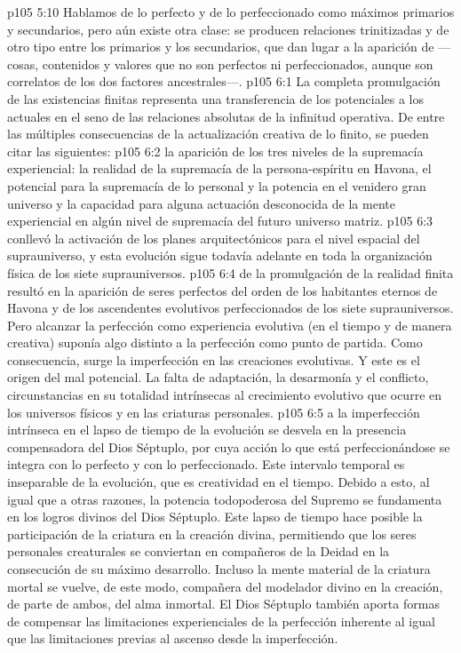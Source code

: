 \vs p105 5:10 Hablamos de lo perfecto y de lo perfeccionado como máximos primarios y secundarios, pero aún existe otra clase: se producen relaciones trinitizadas y de otro tipo entre los primarios y los secundarios, que dan lugar a la aparición de  ---cosas, contenidos y valores que no son perfectos ni perfeccionados, aunque son correlatos de los dos factores ancestrales---.
\vs p105 6:1 La completa promulgación de las existencias finitas representa una transferencia de los potenciales a los actuales en el seno de las relaciones absolutas de la infinitud operativa. De entre las múltiples consecuencias de la actualización creativa de lo finito, se pueden citar las siguientes:
\vs p105 6:2  la aparición de los tres niveles de la supremacía experiencial: la realidad de la supremacía de la persona\hyp{}espíritu en Havona, el potencial para la supremacía de lo personal y la potencia en el venidero gran universo y la capacidad para alguna actuación desconocida de la mente experiencial en algún nivel de supremacía del futuro universo matriz.
\vs p105 6:3  conllevó la activación de los planes arquitectónicos para el nivel espacial del suprauniverso, y esta evolución sigue todavía adelante en toda la organización física de los siete suprauniversos.
\vs p105 6:4  de la promulgación de la realidad finita resultó en la aparición de seres perfectos del orden de los habitantes eternos de Havona y de los ascendentes evolutivos perfeccionados de los siete suprauniversos. Pero alcanzar la perfección como experiencia evolutiva (en el tiempo y de manera creativa) suponía algo distinto a la perfección como punto de partida. Como consecuencia, surge la imperfección en las creaciones evolutivas. Y este es el origen del mal potencial. La falta de adaptación, la desarmonía y el conflicto, circunstancias en su totalidad intrínsecas al crecimiento evolutivo que ocurre en los universos físicos y en las criaturas personales.
\vs p105 6:5  a la imperfección intrínseca en el lapso de tiempo de la evolución se desvela en la presencia compensadora del Dios Séptuplo, por cuya acción lo que está perfeccionándose se integra con lo perfecto y con lo perfeccionado. Este intervalo temporal es inseparable de la evolución, que es creatividad en el tiempo. Debido a esto, al igual que a otras razones, la potencia todopoderosa del Supremo se fundamenta en los logros divinos del Dios Séptuplo. Este lapso de tiempo hace posible la participación de la criatura en la creación divina, permitiendo que los seres personales creaturales se conviertan en compañeros de la Deidad en la consecución de su máximo desarrollo. Incluso la mente material de la criatura mortal se vuelve, de este modo, compañera del modelador divino en la creación, de parte de ambos, del alma inmortal. El Dios Séptuplo también aporta formas de compensar las limitaciones experienciales de la perfección inherente al igual que las limitaciones previas al ascenso desde la imperfección.

